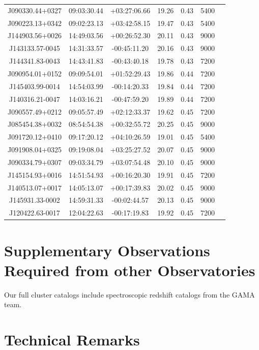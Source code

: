 \documentclass[letterpaper,12pt]{article}
\begin{document}
\begin{table}
\begin{tabular}{ccccccc}
J090330.44+0327 & 09:03:30.44 & +03:27:06.66 & 19.26 & 0.43 & 5400 \\
J090223.13+0342 & 09:02:23.13 & +03:42:58.15 & 19.47 & 0.43 & 5400 \\
J144903.56+0026 & 14:49:03.56 & +00:26:52.30 & 20.11 & 0.43 & 9000 \\
J143133.57-0045 & 14:31:33.57 & -00:45:11.20 & 20.16 & 0.43 & 9000 \\
J144341.83-0043 & 14:43:41.83 & -00:43:40.18 & 19.78 & 0.43 & 7200 \\
J090954.01+0152 & 09:09:54.01 & +01:52:29.43 & 19.86 & 0.44 & 7200 \\
J145403.99-0014 & 14:54:03.99 & -00:14:20.33 & 19.84 & 0.44 & 7200 \\
J140316.21-0047 & 14:03:16.21 & -00:47:59.20 & 19.89 & 0.44 & 7200 \\
J090557.49+0212 & 09:05:57.49 & +02:12:33.37 & 19.62 & 0.45 & 7200 \\
J085454.38+0032 & 08:54:54.38 & +00:32:55.72 & 20.25 & 0.45 & 9000 \\
J091720.12+0410 & 09:17:20.12 & +04:10:26.59 & 19.01 & 0.45 & 5400 \\
J091908.04+0325 & 09:19:08.04 & +03:25:27.52 & 20.07 & 0.45 & 9000 \\
J090334.79+0307 & 09:03:34.79 & +03:07:54.48 & 20.10 & 0.45 & 9000 \\
J145154.93+0016 & 14:51:54.93 & +00:16:20.30 & 19.91 & 0.45 & 7200 \\
J140513.07+0017 & 14:05:13.07 & +00:17:39.83 & 20.02 & 0.45 & 9000 \\
J145931.33-0002 & 14:59:31.33 & -00:02:44.57 & 20.13 & 0.45 & 9000 \\
J120422.63-0017 & 12:04:22.63 & -00:17:19.83 & 19.92 & 0.45 & 7200 \\
\hline
\end{tabular}
\end{table}

\section{Supplementary Observations Required from other Observatories}

Our full cluster catalogs include spectroscopic redshift catalogs from the GAMA team. 

\section{Technical Remarks}
\end{document}

